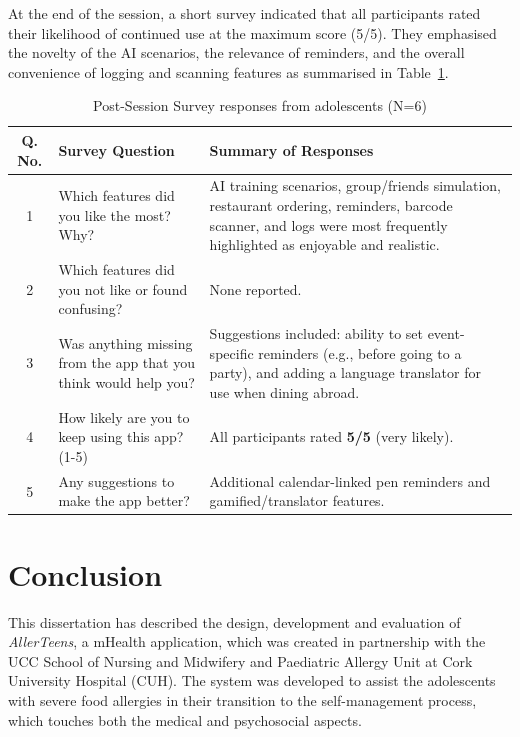 \documentclass[MScCS]{uccthesis}
\begin{document}
At the end of the session, a short survey indicated that all participants rated their likelihood of continued use at the maximum score (5/5). They emphasised the novelty of the AI scenarios, the relevance of reminders, and the overall convenience of logging and scanning features as summarised in Table~\ref{tab:post-session-survey}.

\begin{table}[htbp]
\centering
\small
\caption{Post-Session Survey responses from adolescents (N=6)}
\label{tab:post-session-survey}
\renewcommand{\arraystretch}{1.2}
\setlength{\tabcolsep}{6pt}
\begin{tabular}{|c|p{6cm}|p{6cm}|}
\hline
\textbf{Q. No.} & \textbf{Survey Question} & \textbf{Summary of Responses} \\
\hline
1 & Which features did you like the most? Why? & AI training scenarios, group/friends simulation, restaurant ordering, reminders, barcode scanner, and logs were most frequently highlighted as enjoyable and realistic. \\
2 & Which features did you not like or found confusing? & None reported. \\
3 & Was anything missing from the app that you think would help you? & Suggestions included: ability to set event-specific reminders (e.g., before going to a party), and adding a language translator for use when dining abroad. \\
4 & How likely are you to keep using this app? (1-5) & All participants rated \textbf{5/5} (very likely). \\
5 & Any suggestions to make the app better? & Additional calendar-linked pen reminders and gamified/translator features. \\
\hline
\end{tabular}
\end{table}




\clearpage

\chapter{Conclusion}

This dissertation has described the design, development and evaluation of \textit{AllerTeens}, a mHealth application, which was created in partnership with the UCC School of Nursing and Midwifery and Paediatric Allergy Unit at Cork University Hospital (CUH). The system was developed to assist the adolescents with severe food allergies in their transition to the self-management process, which touches both the medical and psychosocial aspects.
\end{document}
